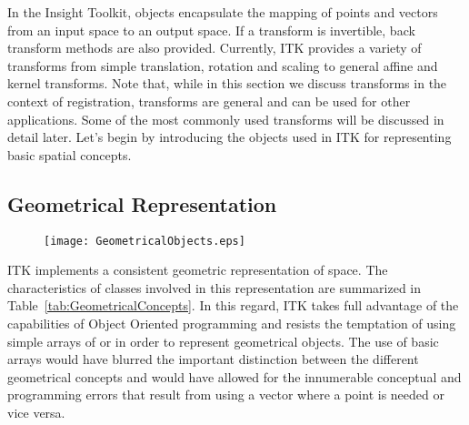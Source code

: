 
\def\tableconfiguration{ | p{3cm} | p{1.8cm} | p{2.5cm} | p{4cm} | }




In the Insight Toolkit,  objects encapsulate the mapping of
points and vectors from an input space to an output space.  If a transform is
invertible, back transform methods are also provided.  Currently, ITK provides
a variety of transforms from simple translation, rotation and scaling to
general affine and kernel transforms.  Note that, while in this section we
discuss transforms in the context of registration, transforms are general and
can be used for other applications. Some of the most commonly used transforms
will be discussed in detail later. Let's begin by introducing the objects used
in ITK for representing basic spatial concepts.


\subsection{Geometrical Representation}
\label{sec:GeometricalObjects}

\begin{figure}
\center
\texttt{[image: GeometricalObjects.eps]}
\label{fig:GeometricalObjects}
\end{figure}

ITK implements a consistent geometric representation of space. The
characteristics of classes involved in this representation are summarized in
Table~\ref{tab:GeometricalConcepts}. In this regard, ITK takes full advantage
of the capabilities of Object Oriented programming and resists the temptation
of using simple arrays of  or  in order to represent
geometrical objects. The use of basic arrays would have blurred the important
distinction between the different geometrical concepts and would have allowed
for the innumerable conceptual and programming errors that result from using a
vector where a point is needed or vice versa.


